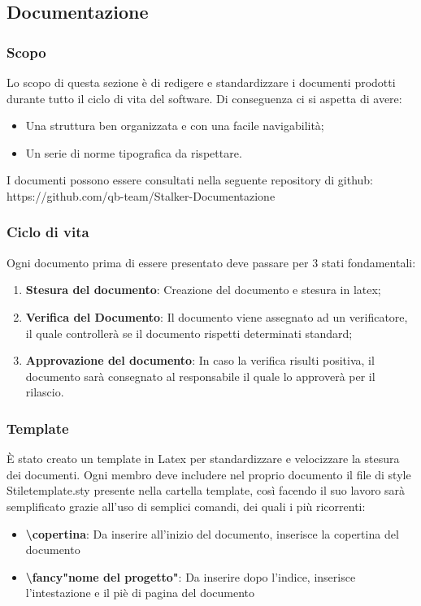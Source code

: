 \subsection{Documentazione}
\subsubsection{Scopo}
Lo scopo di questa sezione è di redigere e standardizzare i documenti prodotti durante tutto il ciclo di vita del software. 
Di conseguenza ci si aspetta di avere:
\begin{itemize}
\item Una struttura ben organizzata e con una facile navigabilità;
\item Un serie di norme tipografica da rispettare.
\end{itemize}
 
I documenti possono essere consultati nella seguente repository di github: https://github.com/qb-team/Stalker-Documentazione

\subsubsection{Ciclo di vita}
Ogni documento prima di essere presentato deve passare per 3 stati fondamentali:
\begin{enumerate}
\item \textbf{Stesura del documento}: Creazione del documento e stesura in latex;
\item \textbf{Verifica del Documento}: Il documento viene assegnato ad un verificatore, il quale controllerà se il documento rispetti determinati standard;
\item \textbf{Approvazione del documento}: In caso la verifica risulti positiva, il documento sarà consegnato al responsabile il quale lo approverà per il rilascio.
\end{enumerate}

\subsubsection{Template}
È stato creato un template in Latex per standardizzare e velocizzare la stesura dei documenti.
Ogni membro deve includere nel proprio documento il file di style Stiletemplate.sty presente nella cartella template, così facendo il suo lavoro sarà semplificato grazie all'uso di semplici comandi, dei quali i più ricorrenti:
\begin{itemize}
\item \textbf{\textbackslash copertina{}}: Da inserire all'inizio del documento, inserisce la copertina del documento
\item \textbf{\textbackslash fancy"nome del progetto"{}}: Da inserire dopo l'indice, inserisce l'intestazione e il piè di pagina del documento
\end{itemize}

